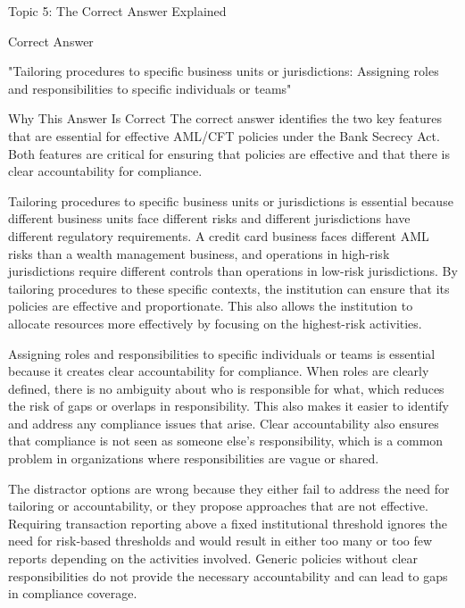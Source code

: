 \documentclass[8pt]{beamer}  %
\newcommand{\correct}{\textcolor{correctgreen}{\ding{51}}}
\begin{document}
	\begin{frame}{Topic 5: The Correct Answer Explained}
		\begin{block}{\large \correct \textcolor{correctgreen}{Correct Answer}}
			\begin{center}
				\Large "Tailoring procedures to specific business units or jurisdictions: Assigning roles and responsibilities to specific individuals or teams"
			\end{center}
		\end{block}
		
		\vspace{0.2cm}
		\begin{block}{\large Why This Answer Is Correct}
			The correct answer identifies the two key features that are essential for effective AML/CFT policies under the Bank Secrecy Act. Both features are critical for ensuring that policies are effective and that there is clear accountability for compliance.
			
			Tailoring procedures to specific business units or jurisdictions is essential because different business units face different risks and different jurisdictions have different regulatory requirements. A credit card business faces different AML risks than a wealth management business, and operations in high-risk jurisdictions require different controls than operations in low-risk jurisdictions. By tailoring procedures to these specific contexts, the institution can ensure that its policies are effective and proportionate. This also allows the institution to allocate resources more effectively by focusing on the highest-risk activities.
			
			Assigning roles and responsibilities to specific individuals or teams is essential because it creates clear accountability for compliance. When roles are clearly defined, there is no ambiguity about who is responsible for what, which reduces the risk of gaps or overlaps in responsibility. This also makes it easier to identify and address any compliance issues that arise. Clear accountability also ensures that compliance is not seen as someone else's responsibility, which is a common problem in organizations where responsibilities are vague or shared.
			
			The distractor options are wrong because they either fail to address the need for tailoring or accountability, or they propose approaches that are not effective. Requiring transaction reporting above a fixed institutional threshold ignores the need for risk-based thresholds and would result in either too many or too few reports depending on the activities involved. Generic policies without clear responsibilities do not provide the necessary accountability and can lead to gaps in compliance coverage.
		\end{block}
		

\end{frame}
\end{document}
